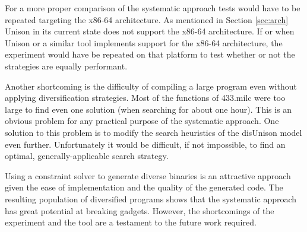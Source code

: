 For a more proper comparison of the systematic approach tests would have to be repeated
targeting the x86-64 architecture. As mentioned in Section \ref{sec:arch} Unison in its
current state does not support the x86-64 architecture. If or when Unison or a similar
tool implements support for the x86-64 architecture, the experiment would have be repeated
on that platform to test whether or not the strategies are equally performant.

Another shortcoming is the difficulty of compiling a large program even without applying
diversification strategies. Most of the functions of 433.milc were too large to find even
one solution (when searching for about one hour). This is an obvious problem for any
practical purpose of the systematic approach. One solution to this problem is to modify
the search heuristics of the disUnison model even further. Unfortunately it would be
difficult, if not impossible, to find an optimal, generally-applicable search strategy.

Using a constraint solver to generate diverse binaries is an attractive approach given
the ease of implementation and the quality of the generated code. The resulting population
of diversified programs shows that the systematic approach has great potential at breaking
gadgets. However, the shortcomings of the experiment and the tool are a testament to the
future work required.

